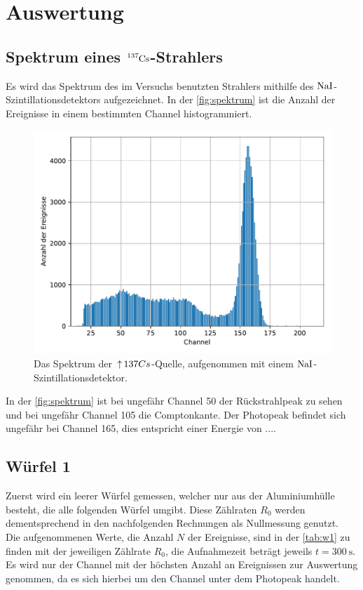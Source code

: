\section{Auswertung}
\label{sec:Auswertung}

\subsection{Spektrum eines $\ce{^{137}Cs}$-Strahlers}

  \noindent Es wird das Spektrum des im Versuchs benutzten Strahlers mithilfe des $\ce{NaI}$-Szintillationsdetektors aufgezeichnet. 
  In der \autoref{fig:spektrum} ist die Anzahl der Ereignisse in einem bestimmten Channel histogrammiert. 

  \begin{figure}[H]
    \centering
    \includegraphics[width=\textwidth]{build/spektrum.pdf}
    \caption{Das Spektrum der $\ce^{137}Cs$-Quelle, aufgenommen mit einem $\ce{NaI}$-Szintillationsdetektor.}
    \label{fig:spektrum}
  \end{figure}

  \noindent In der \autoref{fig:spektrum} ist bei ungefähr Channel 50 der Rückstrahlpeak zu sehen und bei ungefähr Channel 105 die Comptonkante. 
  Der Photopeak befindet sich ungefähr bei Channel 165, dies entspricht einer Energie von ....


\subsection{Würfel 1}

  \noindent Zuerst wird ein leerer Würfel gemessen, welcher nur aus der Aluminiumhülle besteht, die alle folgenden Würfel umgibt. Diese Zählraten $R_0$ werden
  dementsprechend in den nachfolgenden Rechnungen als Nullmessung genutzt. \\
  Die aufgenommenen Werte, die Anzahl $N$ der Ereignisse, sind in der \autoref{tab:w1} zu finden mit der jeweiligen Zählrate $R_0$,  die Aufnahmezeit beträgt jeweils
   $t = \SI{300}{\second}$. Es wird nur der Channel mit der höchsten Anzahl an Ereignissen zur Auswertung genommen, da es sich hierbei um den Channel unter dem Photopeak handelt. 


